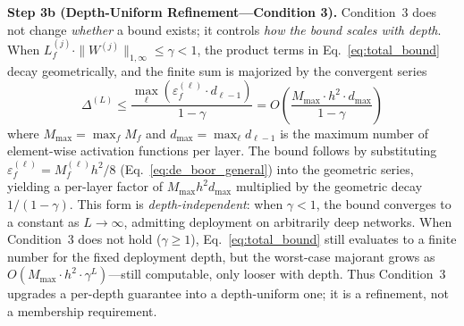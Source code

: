 \vspace{2pt}
\noindent\textbf{Step 3b (Depth-Uniform Refinement---Condition 3).}
Condition~3 does not change \textit{whether} a bound exists; it controls
\textit{how the bound scales with depth}. When
$L_f^{(j)} \cdot \|W^{(j)}\|_{1,\infty} \leq \gamma < 1$, the product terms in
Eq.~\ref{eq:total_bound} decay geometrically, and the finite sum is majorized
by the convergent series
\begin{equation}
\Delta^{(L)} \leq \frac{\max_\ell(\varepsilon_f^{(\ell)} \cdot
d_{\ell-1})}{1 - \gamma}
= O\!\left(\frac{M_{\max} \cdot h^2 \cdot d_{\max}}{1-\gamma}\right)
\label{eq:convergent_bound}
\end{equation}
where $M_{\max} = \max_f M_f$ and $d_{\max} = \max_\ell d_{\ell-1}$
is the maximum number of element-wise activation functions per layer.
The bound follows by substituting $\varepsilon_f^{(\ell)} =
M_f^{(\ell)} h^2 / 8$ (Eq.~\ref{eq:de_boor_general}) into the
geometric series, yielding a per-layer factor of $M_{\max} h^2 d_{\max}$
multiplied by the geometric decay $1/(1-\gamma)$. This form is
\emph{depth-independent}: when $\gamma < 1$, the bound converges to a
constant as $L \to \infty$, admitting deployment on
arbitrarily deep networks. When Condition~3 does not hold ($\gamma \geq 1$),
Eq.~\ref{eq:total_bound} still evaluates to a finite number for the fixed
deployment depth, but the worst-case majorant grows as
$O(M_{\max} \cdot h^2 \cdot \gamma^L)$---still computable, only looser with
depth. Thus Condition~3 upgrades a per-depth guarantee into a depth-uniform
one; it is a refinement, not a membership requirement.

